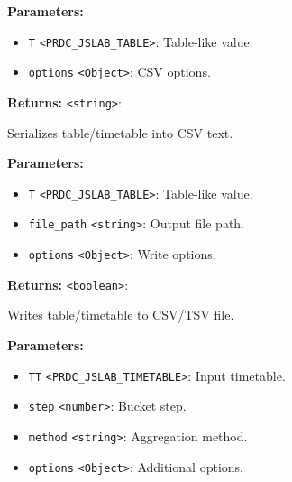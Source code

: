 \documentclass[12pt,a4paper]{article}
\begin{document}
\vspace{5mm}
\noindent {}


\noindent \textbf{Parameters:}
\begin{itemize}
  \item \texttt{T} \texttt{<PRDC\_JSLAB\_TABLE>}: Table-like value.
  \item \texttt{options} \texttt{<Object>}: CSV options.
\end{itemize}

\noindent \textbf{Returns:} \texttt{<string>}:

\noindent Serializes table/timetable into CSV text.

\vspace{5mm}
\noindent {}


\noindent \textbf{Parameters:}
\begin{itemize}
  \item \texttt{T} \texttt{<PRDC\_JSLAB\_TABLE>}: Table-like value.
  \item \texttt{file\_path} \texttt{<string>}: Output file path.
  \item \texttt{options} \texttt{<Object>}: Write options.
\end{itemize}

\noindent \textbf{Returns:} \texttt{<boolean>}:

\noindent Writes table/timetable to CSV/TSV file.

\vspace{5mm}
\noindent {}


\noindent \textbf{Parameters:}
\begin{itemize}
  \item \texttt{TT} \texttt{<PRDC\_JSLAB\_TIMETABLE>}: Input timetable.
  \item \texttt{step} \texttt{<number>}: Bucket step.
  \item \texttt{method} \texttt{<string>}: Aggregation method.
  \item \texttt{options} \texttt{<Object>}: Additional options.
\end{itemize}
\end{document}
